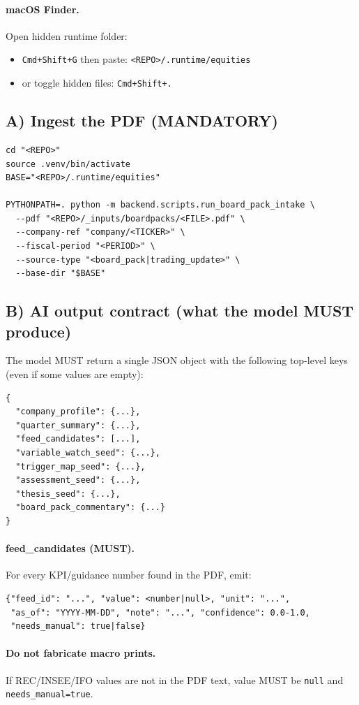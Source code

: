 \paragraph{macOS Finder.}
Open hidden runtime folder:
\begin{itemize}
  \item \texttt{Cmd+Shift+G} then paste: \texttt{<REPO>/.runtime/equities}
  \item or toggle hidden files: \texttt{Cmd+Shift+.}
\end{itemize}

\subsection*{A) Ingest the PDF (MANDATORY)}
\begin{verbatim}
cd "<REPO>"
source .venv/bin/activate
BASE="<REPO>/.runtime/equities"

PYTHONPATH=. python -m backend.scripts.run_board_pack_intake \
  --pdf "<REPO>/_inputs/boardpacks/<FILE>.pdf" \
  --company-ref "company/<TICKER>" \
  --fiscal-period "<PERIOD>" \
  --source-type "<board_pack|trading_update>" \
  --base-dir "$BASE"
\end{verbatim}

\subsection*{B) AI output contract (what the model MUST produce)}
The model MUST return a single JSON object with the following top-level keys (even if some values are empty):
\begin{verbatim}
{
  "company_profile": {...},
  "quarter_summary": {...},
  "feed_candidates": [...],
  "variable_watch_seed": {...},
  "trigger_map_seed": {...},
  "assessment_seed": {...},
  "thesis_seed": {...},
  "board_pack_commentary": {...}
}
\end{verbatim}

\paragraph{feed\_candidates (MUST).}
For every KPI/guidance number found in the PDF, emit:
\begin{verbatim}
{"feed_id": "...", "value": <number|null>, "unit": "...",
 "as_of": "YYYY-MM-DD", "note": "...", "confidence": 0.0-1.0,
 "needs_manual": true|false}
\end{verbatim}

\paragraph{Do not fabricate macro prints.}
If REC/INSEE/IFO values are not in the PDF text, value MUST be \texttt{null} and \texttt{needs\_manual=true}.

